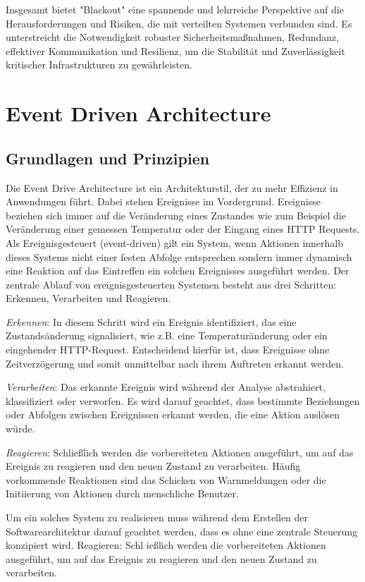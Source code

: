 \documentclass[a4paper,12pt]{article}
\let\stdsection\section
\renewcommand\section{\newpage\stdsection}
\begin{document}
Insgesamt bietet "Blackout" eine spannende und lehrreiche Perspektive auf die Herausforderungen und Risiken, die mit verteilten Systemen verbunden sind. Es unterstreicht die Notwendigkeit robuster Sicherheitsmaßnahmen, Redundanz, effektiver Kommunikation und Resilienz, um die Stabilität und Zuverlässigkeit kritischer Infrastrukturen zu gewährleisten.

\section{Event Driven Architecture}
\subsection{Grundlagen und Prinzipien}
Die Event Drive Architecture ist ein Architekturstil, der zu mehr Effizienz in Anwendungen führt. Dabei stehen Ereignisse im Vordergrund. Ereignisse beziehen sich immer auf die Veränderung eines Zustandes wie zum Beispiel die Veränderung einer gemessen Temperatur oder der Eingang eines HTTP Requests.
Als Ereignisgesteuert (event-driven) gilt ein System, wenn Aktionen innerhalb dieses Systems nicht einer festen Abfolge entsprechen sondern immer dynamisch eine Reaktion auf das Eintreffen ein solchen Ereignisses ausgeführt werden.
Der zentrale Ablauf von ereignisgesteuerten Systemen besteht aus drei Schritten: Erkennen, Verarbeiten und Reagieren. \cite[S. 48f]{Bruns2010}

\textit{Erkennen}: In diesem Schritt wird ein Ereignis identifiziert, das eine Zustandsänderung signalisiert, wie z.B. eine Temperaturänderung oder ein eingehender HTTP-Request. Entscheidend hierfür ist, dass Ereignisse ohne Zeitverzögerung und somit unmittelbar nach ihrem Auftreten erkannt werden.

\textit{Verarbeiten}: Das erkannte Ereignis wird während der Analyse abstrahiert, klassifiziert oder verworfen. Es wird darauf geachtet, dass bestimmte Beziehungen oder Abfolgen zwischen Ereignissen erkannt werden, die eine Aktion auslösen würde.

\textit{Reagieren}: Schließlich werden die vorbereiteten Aktionen ausgeführt, um auf das Ereignis zu reagieren und den neuen Zustand zu verarbeiten. Häufig vorkommende Reaktionen sind das Schicken von Warnmeldungen oder die Initiierung von Aktionen durch menschliche Benutzer. 

Um ein solches System zu realisieren muss während dem Erstellen der Softwarearchitektur darauf geachtet werden, dass es ohne eine zentrale Steuerung konzipiert wird.
Reagieren: Schl ießlich werden die vorbereiteten Aktionen ausgeführt, um auf das Ereignis zu reagieren und den neuen Zustand zu verarbeiten. \cite[S. 50]{Bruns2010}
\end{document}
